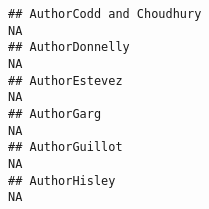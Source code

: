 \documentclass[]{article}
\begin{document}
\begin{verbatim}
## AuthorCodd and Choudhury                                                                                                                                                                                                                                                                                                                                                                                                                                                                NA
## AuthorDonnelly                                                                                                                                                                                                                                                                                                                                                                                                                                                                          NA
## AuthorEstevez                                                                                                                                                                                                                                                                                                                                                                                                                                                                           NA
## AuthorGarg                                                                                                                                                                                                                                                                                                                                                                                                                                                                              NA
## AuthorGuillot                                                                                                                                                                                                                                                                                                                                                                                                                                                                           NA
## AuthorHisley                                                                                                                                                                                                                                                                                                                                                                                                                                                                            NA

\end{verbatim}
\end{document}

